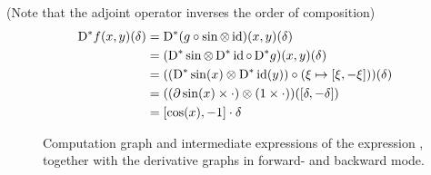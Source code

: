 (Note that the adjoint operator inverses the order of composition)
\begin{equation}
  \begin{aligned}
    \mathop{}\!\mathrm{D}^{*} f(x, y)(\delta) &= \mathop{}\!\mathrm{D}^{*} (g \circ \sin \otimes \operatorname{id})(x, y)(\delta)\\
    &= (\mathop{}\!\mathrm{D}^{*} \sin \otimes \mathop{}\!\mathrm{D}^{*} \operatorname{id} \circ \mathop{}\!\mathrm{D}^{*} g)(x, y)(\delta) \\
    &= ((\mathop{}\!\mathrm{D}^{*} \sin(x) \otimes \mathop{}\!\mathrm{D}^{*} \operatorname{id}(y)) \circ (\xi \mapsto [\xi, -\xi])) (\delta) \\
    &= ((\partial \sin(x) \times \cdot) \otimes (1 \times \cdot))([\delta, -\delta])  \\
    &= [\cos(x), -1] \cdot \delta
  \end{aligned}
\end{equation}


\begin{figure}[t]
  \centering
  \bigskip
  \caption{Computation graph and intermediate expressions of the expression \protect{}, together with the derivative graphs in forward- and backward mode.}
  \label{fig:comp-graph}
\end{figure}



